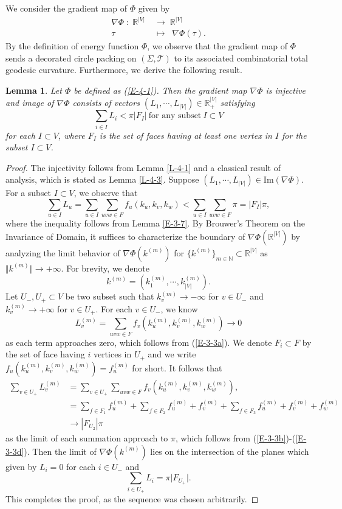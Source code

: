 \documentclass[11pt,leqno]{article}
\numberwithin{equation}{section}
\newtheorem{lemma}[theorem]{Lemma}
\theoremstyle{definition}
\begin{document}
We consider the gradient map of  $\Phi$ given by
\begin{equation}
\begin{aligned}\label{E-4-2}
\nabla\Phi\;:\;\mathbb{R}^{|V|}\;&\longrightarrow\;\mathbb{R}^{|V|}\\
\tau\;\;\;\,&\longmapsto\;\;\nabla\Phi(\tau).
\end{aligned}
\end{equation}
By the definition of energy function $\Phi$, we observe that the gradient map of  $\Phi$ sends a decorated circle packing on $(\Sigma,\mathcal T)$ to its associated combinatorial total geodesic curvature.
Furthermore, we derive the following result.



\begin{lemma}\label{L-4-2}
Let $\Phi$ be defined as (\ref{E-4-1}). Then the gradient map $\nabla\Phi$ is injective and image of $\nabla\Phi$ consists of vectors $(L_1,\cdots,L_{|V|})\in\mathbb{R}^{|V|}_{+}$ satisfying
\[\sum_{i\in I}L_i<\pi\vert F_I\vert\ \text{for any subset}\ I\subset V\]
for each $I\subset V$,  where $F_I$ is the set of faces having at least one vertex in $I$ for the subset $I\subset V$.
\end{lemma}
\begin{proof}
The injectivity follows from Lemma \ref{L-4-1} and a classical result of analysis, which is stated as Lemma \ref{L-4-3}. Suppose $(L_1,\cdots,L_{|V|})\in\mathrm{Im}(\nabla\Phi)$.
For a subset $I\subset V$, we observe that
\[\sum_{u\in I}L_u=\sum_{u\in I}\sum_{uvw\in F}f_u(k_u,k_v,k_w)<\sum_{u\in I}\sum_{uvw\in F}\pi=|F_I|\pi,\]
where the inequality follows from Lemma \ref{E-3-7}.
By Brouwer's Theorem on the Invariance of Domain, it suffices to characterize the boundary of $\nabla\Phi(\mathbb{R}^{|V|})$ by analyzing the limit behavior of $\nabla\Phi(k^{(m)})$ for $\{k^{(m)}\}_{m\in\mathbb{N}}\subset\mathbb{R}^{|V|}$ as $\Vert k^{(m)}\Vert\to+\infty$.
For brevity, we denote 
\[k^{(m)}=(k_1^{(m)},\cdots,k_{|V|}^{(m)}).\]
Let $U_-,U_+\subset V$ be two subset such that $k_v^{(m)}\to-\infty$ for $v\in U_-$ and $k_v^{(m)}\to+\infty$ for $v\in U_+$. For each $v\in U_-$, we know
\[L_v^{(m)}=\sum_{uvw\in F}f_v(k_u^{(m)},k_v^{(m)},k_w^{(m)})\to 0\]
 as each term approaches zero, which follows from (\ref{E-3-3a}). We denote $F_i\subset F$ by the set of face having $i$ vertices in $U_+$ and we write $f_u(k_u^{(m)},k_v^{(m)},k_w^{(m)})=f^{(m)}_u$ for short. It follows that
\[\begin{aligned}
\sum_{v\in U_+}L_v^{(m)}&=\sum_{v\in U_+}\sum_{uvw\in F}f_v(k_u^{(m)},k_v^{(m)},k_w^{(m)}),\\
&=\sum_{f\in F_1}f^{(m)}_u+\sum_{f\in F_2}f^{(m)}_u+f^{(m)}_v+\sum_{f\in F_3}f^{(m)}_u+f^{(m)}_v+f^{(m)}_w\\
&\to |F_{U_2}|\pi
\end{aligned}\]
as the limit of each summation approach to $\pi$, which follows from (\ref{E-3-3b})-(\ref{E-3-3d}). Then the limit of $\nabla\Phi(k^{(m)})$ lies on the intersection of the planes which given by $L_i=0$ for each $i\in U_-$ and
\[\sum_{i\in U_+}L_i=\pi\vert F_{U_+
}\vert.\]
This completes the proof, as the sequence was chosen arbitrarily.
\end{proof}
\end{document}
